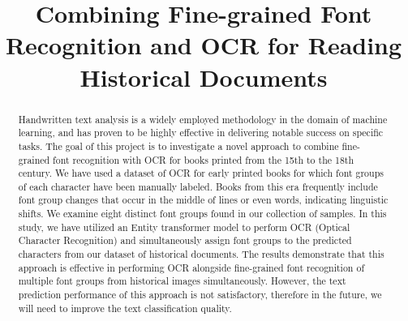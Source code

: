 \documentclass[conference]{IEEEtran}
\begin{document}
\title {Combining Fine-grained Font Recognition and OCR for Reading Historical Documents}

\author{
}

\maketitle

\begin{abstract}
Handwritten text analysis is a widely employed methodology in the domain of machine learning, and has proven to be highly effective in delivering notable success on specific tasks. The goal of this project is to investigate a novel approach to combine fine-grained font recognition with OCR for books printed from the 15th to the 18th century. We have used a dataset of OCR for early printed books for which font groups of each character have been manually labeled. Books from this era frequently include font group changes that occur in the middle of lines or even words, indicating linguistic shifts. We examine eight distinct font groups found in our collection of samples. In this study, we have utilized an Entity transformer model to perform OCR (Optical Character Recognition) and simultaneously assign font groups to the predicted characters from our dataset of historical documents. The results demonstrate that this approach is effective in performing OCR  alongside fine-grained font recognition of multiple font groups from historical images simultaneously. However, the text prediction performance of this approach is not satisfactory, therefore in the future, we will need to improve the text classification quality.
\end{abstract}
\end{document}
